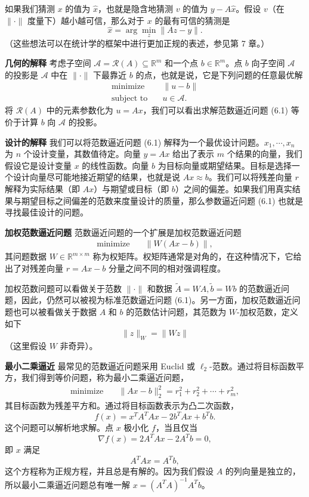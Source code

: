 \documentclass[UTF8,12pt,a4paper,fontset=fandol]{ctexart}
\begin{document}
如果我们猜测 $x$ 的值为 $\hat{x}$，也就是隐含地猜测 $v$ 的值为 $y-A\hat{x}$。假设 $v$（在 $\|\cdot\|$ 度量下）越小越可信，那么对于 $x$ 的最有可信的猜测是
\[
\hat{x}=\arg\min_z \|Az-y\|.
\]
（这些想法可以在统计学的框架中进行更加正规的表述，参见第 7 章。）

\noindent\textbf{几何的解释}\quad
考虑子空间 $\mathcal{A}=\mathcal{R}(A)\subseteq\mathbb{R}^m$ 和一个点 $b\in\mathbb{R}^m$。点 $b$ 向子空间 $\mathcal{A}$ 的投影是 $\mathcal{A}$ 中在 $\|\cdot\|$ 下最靠近 $b$ 的点，也就是说，它是下列问题的任意最优解
\[
\begin{aligned}
\text{minimize}\quad & \|u-b\|\\
\text{subject to}\quad & u\in\mathcal{A}.
\end{aligned}
\]
将 $\mathcal{R}(A)$ 中的元素参数化为 $u=Ax$，我们可以看出求解范数逼近问题 (6.1) 等价于计算 $b$ 向 $\mathcal{A}$ 的投影。

\noindent\textbf{设计的解释}\quad
我们可以将范数逼近问题 (6.1) 解释为一个最优设计问题。$x_1,\cdots,x_n$ 为 $n$ 个设计变量，其数值待定。向量 $y=Ax$ 给出了表示 $m$ 个结果的向量，我们假设它是设计变量 $x$ 的线性函数。向量 $b$ 为目标向量或期望结果。目标是选择一个设计向量尽可能地接近期望的结果，也就是说 $Ax\approx b$。我们可以将残差向量 $r$ 解释为实际结果（即 $Ax$）与期望或目标（即 $b$）之间的偏差。如果我们用真实结果与期望目标之间偏差的范数来度量设计的质量，那么参数逼近问题 (6.1) 也就是寻找最佳设计的问题。

\noindent\textbf{加权范数逼近问题}\quad
范数逼近问题的一个扩展是加权范数逼近问题
\[
\begin{aligned}
\text{minimize}\quad & \|W(Ax-b)\|,
\end{aligned}
\]
其问题数据 $W\in\mathbb{R}^{m\times m}$ 称为权矩阵。权矩阵通常是对角的，在这种情况下，它给出了对残差向量 $r=Ax-b$ 分量之间不同的相对强调程度。

加权范数问题可以看做关于范数 $\|\cdot\|$ 和数据 $\tilde{A}=WA,\tilde{b}=Wb$ 的范数逼近问题，因此，仍然可以被视为标准范数逼近问题 (6.1)。另一方面，加权范数逼近问题也可以被看做关于数据 $A$ 和 $b$ 的范数估计问题，其范数为 $W$-加权范数，定义如下
\[
\|z\|_W=\|Wz\|
\]
（这里假设 $W$ 非奇异）。

\noindent\textbf{最小二乘逼近}\quad
最常见的范数逼近问题采用 Euclid 或 $\ell_2$-范数。通过将目标函数平方，我们得到等价问题，称为最小二乘逼近问题，
\[
\begin{aligned}
\text{minimize}\quad & \|Ax-b\|_2^2=r_1^2+r_2^2+\cdots+r_m^2,
\end{aligned}
\]
其目标函数为残差平方和。通过将目标函数表示为凸二次函数，
\[
f(x)=x^TA^TAx-2b^TAx+b^Tb.
\]
这个问题可以解析地求解。点 $x$ 极小化 $f$，当且仅当
\[
\nabla f(x)=2A^TAx-2A^Tb=0,
\]
即 $x$ 满足
\[
A^TAx=A^Tb,
\]
这个方程称为正规方程，并且总是有解的。因为我们假设 $A$ 的列向量是独立的，所以最小二乘逼近问题总有唯一解 $x=(A^TA)^{-1}A^Tb$。
\end{document}
